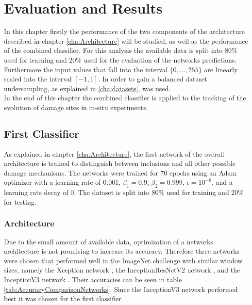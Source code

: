 
\chapter{Evaluation and Results} %

\label{Performance} %

In this chapter firstly the performance of the two components of the architecture described in chapter \ref{cha:Architecture} will be studied, as well as the performance of the combined classifier. For this analysis the available data is split into $80\% $ used for learning and $20\% $ used for the evaluation of the networks predictions. Furthermore the input values that fall into the interval $\{ 0, \dots , 255\}$ are linearly scaled into the interval $[-1,1]$. In order to gain a balanced dataset undersampling, as explained in \ref{cha:datasets}, was used. \\

In the end of this chapter the combined classifier is applied to the tracking of the evolution of damage sites in in-situ experiments.


\section{First Classifier}

As explained in chapter \ref{cha:Architecture}, the first network of the overall architecture is trained to distinguish between inclusions and all other possible damage mechanisms. The networks were trained for $70$ epochs using an Adam optimizer with a learning rate of $0.001$, $\beta_1=0.9$, $\beta_2=0.999$, $\epsilon=10^{-8}$, and a learning rate decay of $0$. The dataset is split into $80\%$ used for training and $20\%$ for testing. 

\subsection{Architecture}

Due to the small amount of available data, optimization of a networks architecture is not promising to increase its accuracy. Therefore three networks were chosen that performed well in the ImageNet challenge with similar window sizes, namely the Xception network \cite{Xception}, the InceptionResNetV2 network \cite{InceptionResNetV2}, and the InceptionV3 network \cite{InceptionV3}. Their accuracies can be seen in table \ref{tab:AccuracyComparisonNetworks}. Since the InceptionV3 network performed best it was chosen for the first classifier.\\

